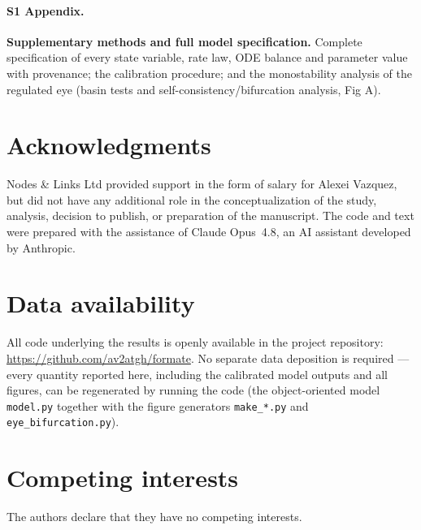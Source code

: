 \documentclass[10pt,letterpaper]{article}
\begin{document}
\paragraph*{S1 Appendix.}
\label{S1_Appendix}
\textbf{Supplementary methods and full model specification.} Complete
specification of every state variable, rate law, ODE balance and parameter value
with provenance; the calibration procedure; and the monostability analysis of the
regulated eye (basin tests and self-consistency/bifurcation analysis, Fig A).

\section*{Acknowledgments}
Nodes \& Links Ltd provided support in the form of salary for Alexei Vazquez, but
did not have any additional role in the conceptualization of the study, analysis,
decision to publish, or preparation of the manuscript. The code and text were
prepared with the assistance of Claude Opus~4.8, an AI assistant developed by
Anthropic.

\section*{Data availability}
All code underlying the results is openly available in the project repository:
\url{https://github.com/av2atgh/formate}. No separate data deposition is required
--- every quantity reported here, including the calibrated model outputs and all
figures, can be regenerated by running the code (the object-oriented model
\texttt{model.py} together with the figure generators \texttt{make\_*.py} and
\texttt{eye\_bifurcation.py}).

\section*{Competing interests}
The authors declare that they have no competing interests.

\nolinenumbers


\end{document}
